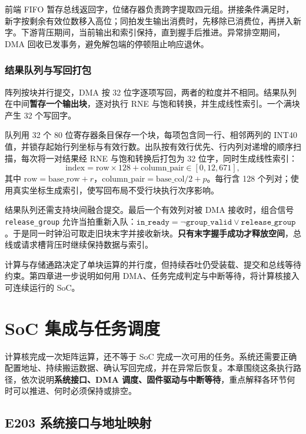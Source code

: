 \documentclass[UTF8,a4paper,zihao=-4,fontset=none,openany,oneside]{ctexrep}
\begin{document}
前端 FIFO 暂存总线返回字，位储存器负责跨字提取四元组。拼接条件满足时，新字按剩余有效位数移入高位；同拍发生输出消费时，先移除已消费位，再拼入新字。下游背压期间，当前输出和索引保持，直到握手后推进。异常排空期间，DMA 回收已发事务，避免解包端的停顿阻止响应退休。

\subsection{结果队列与写回打包}

阵列按块并行提交，DMA 按 32 位字逐项写回，两者的粒度并不相同。结果队列在中间\textbf{暂存一个输出块}，逐对执行 RNE 与饱和转换，并生成线性索引。一个满块产生 32 个写回字。

队列用 32 个 80 位寄存器条目保存一个块，每项包含同一行、相邻两列的 INT40 值，并锁存起始行列坐标与有效行数。出队按有效行优先、行内列对递增的顺序扫描，每次将一对结果经 RNE 与饱和转换后打包为 32 位字，同时生成线性索引：
\begin{equation}
\label{eq:output-index}
\text{index}=\text{row}\times128+\text{column\_pair}\in[0,12{,}671],
\end{equation}
其中 $\text{row}=\text{base\_row}+r$，$\text{column\_pair}=\text{base\_col}/2+p$。每行含 128 个列对；使用真实坐标生成索引，使写回布局不受行块执行次序影响。

结果队列还需支持块间融合提交。最后一个有效列对被 DMA 接收时，组合信号 \texttt{release\_group} 允许当拍重新入队：$\texttt{in\_ready}=\neg\texttt{group\_valid}\lor\texttt{release\_group}$。于是同一时钟沿可取走旧块末字并接收新块。\textbf{只有末字握手成功才释放空间}，总线或请求槽背压时继续保持数据与索引。





计算与存储通路决定了单块运算的并行度，但持续吞吐仍受装载、提交和总线等待约束。第四章进一步说明如何用 DMA、任务完成判定与中断等待，将计算核接入可连续运行的 SoC。

\chapter{SoC 集成与任务调度}

计算核完成一次矩阵运算，还不等于 SoC 完成一次可用的任务。系统还需要正确配置地址、持续搬运数据、确认写回完成，并在异常后恢复。本章围绕这条执行路径，依次说明\textbf{系统接口、DMA 调度、固件驱动与中断等待}，重点解释各环节何时可以推进、何时必须保持或排空。

\section{E203 系统接口与地址映射}
\end{document}
